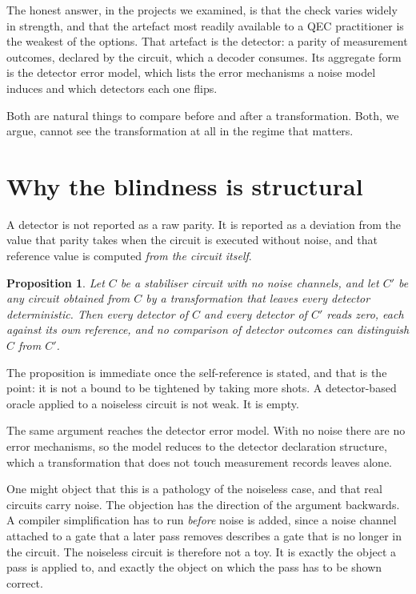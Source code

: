 \documentclass[twocolumn,10pt]{article}
\newtheorem{proposition}{Proposition}
\begin{document}
The honest answer, in the projects we examined, is that the check varies widely
in strength, and that the artefact most readily available to a QEC practitioner
is the weakest of the options. That artefact is the detector: a parity of
measurement outcomes, declared by the circuit, which a decoder consumes. Its
aggregate form is the detector error model, which lists the error mechanisms a
noise model induces and which detectors each one flips.

Both are natural things to compare before and after a transformation. Both, we
argue, cannot see the transformation at all in the regime that matters.

\section{Why the blindness is structural}

A detector is not reported as a raw parity. It is reported as a deviation from
the value that parity takes when the circuit is executed without noise, and that
reference value is computed \emph{from the circuit itself}.

\begin{proposition}
Let $C$ be a stabiliser circuit with no noise channels, and let $C'$ be any
circuit obtained from $C$ by a transformation that leaves every detector
deterministic. Then every detector of $C$ and every detector of $C'$ reads zero,
each against its own reference, and no comparison of detector outcomes can
distinguish $C$ from $C'$.
\end{proposition}

The proposition is immediate once the self-reference is stated, and that is the
point: it is not a bound to be tightened by taking more shots. A detector-based
oracle applied to a noiseless circuit is not weak. It is empty.

The same argument reaches the detector error model. With no noise there are no
error mechanisms, so the model reduces to the detector declaration structure,
which a transformation that does not touch measurement records leaves alone.

One might object that this is a pathology of the noiseless case, and that real
circuits carry noise. The objection has the direction of the argument backwards.
A compiler simplification has to run \emph{before} noise is added, since a noise
channel attached to a gate that a later pass removes describes a gate that is no
longer in the circuit. The noiseless circuit is therefore not a toy. It is
exactly the object a pass is applied to, and exactly the object on which the
pass has to be shown correct.
\end{document}
